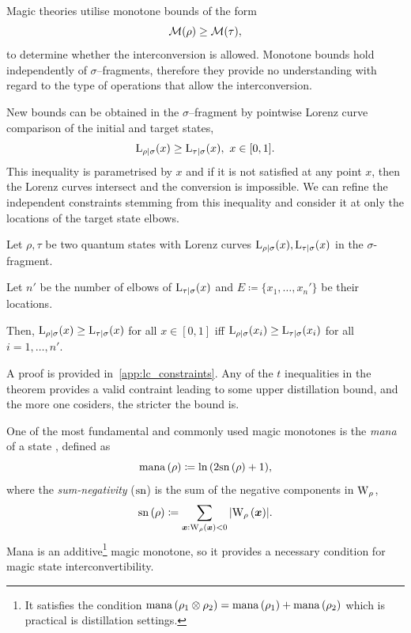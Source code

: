 \documentclass[pra,
aps,
twocolumn,
superscriptaddress,
groupedaddress,
nofootinbib,
reprint
]{revtex4-1}
\begin{document}
Magic theories utilise monotone bounds of the form
\begin{equation}\label{eq:majbound}
    \mathcal{M}(\rho) \geq \mathcal{M}(\tau),
\end{equation}
to determine whether the interconversion is allowed.
Monotone bounds hold independently of $\sigma$--fragments, therefore they provide no understanding with regard to the type of operations that allow the interconversion.

New bounds can be obtained in the $\sigma$--fragment by pointwise Lorenz curve comparison of the initial and target states,
\begin{equation}\label{eq:majbound}
    {{\rm{L}}_{\rho|\sigma}}(x) \geq {{\rm{L}}_{\tau|\sigma}}(x),\ x\in [0,1].
\end{equation}
This inequality is parametrised by $x$ and if it is not satisfied at any point $x$, then the Lorenz curves intersect and the conversion is impossible.
We can refine the independent constraints stemming from this inequality and consider it at only the locations of the target state elbows.
\begin{theorem}\label{thm:elbows}
	Let $\rho, \tau$ be two quantum states with Lorenz curves ${{\rm{L}}_{\rho|\sigma}}(x), {{\rm{L}}_{\tau|\sigma}}(x)$ in the $\sigma$-fragment.
	
	Let $n'$ be the number of elbows of ${{\rm{L}}_{\tau|\sigma}}(x)$ and $E \coloneqq \{x_1, \dots, x_n'\}$ be their locations.
	
	Then, ${{\rm{L}}_{\rho|\sigma}}(x) \geq {{\rm{L}}_{\tau|\sigma}}(x)$ for all $x \in [0,1]$ iff ${{\rm{L}}_{\rho|\sigma}}(x_{i}) \geq {{\rm{L}}_{\tau|\sigma}}(x_{i})$ for all $i =1,\dots,n'$.
\end{theorem}
A proof is provided in~\cref{app:lc_constraints}.
Any of the $t$ inequalities in the theorem provides a valid contraint leading to some upper distillation bound, and the more one cosiders, the stricter the bound is.


One of the most fundamental and commonly used magic monotones is the \emph{mana} of a state , defined as
\begin{equation}
    {{\rm{mana}}\left(\rho\right)} \coloneqq \ln{(2 {{\rm{sn}}\left(\rho\right)} +1)},
\end{equation}
where the \emph{sum-negativity} ($\rm{sn}$)  is the sum of the negative components in $\W{\rho}$,
\begin{equation}
    \sn{\rho} \coloneqq \sum\limits_{\bmx: \W[\bmx]{\rho} < 0} \abs{\W[\bmx]{\rho}}.
\end{equation}
Mana is an additive\footnote{It satisfies the condition ${{\rm{mana}}\left(\rho_1 \otimes \rho_2\right)} = {{\rm{mana}}\left(\rho_1\right)} + {{\rm{mana}}\left(\rho_2\right)}$ which is practical is distillation settings.} magic monotone, so it provides a necessary condition for magic state interconvertibility.
\end{document}
